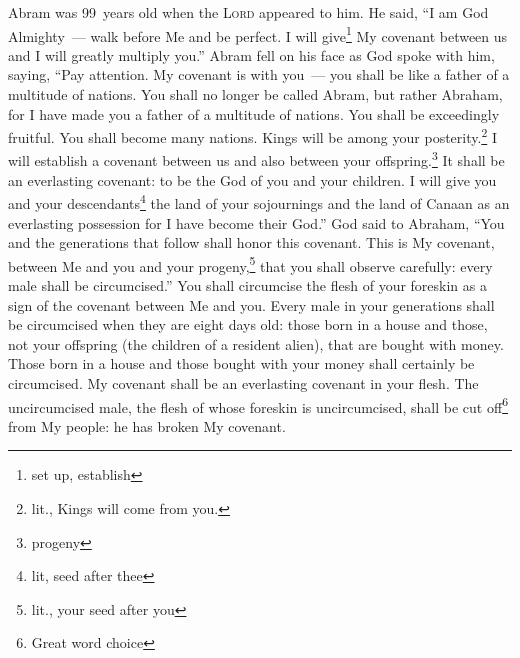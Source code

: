 
\begin{inparaenum}
     Abram was 99~years old when the \textsc{Lord} appeared to him. He said, ``I am God Almighty~--- walk before Me and be perfect.%
     I will give\footnote{set up, establish} My covenant between us and I will greatly multiply you.''%
     Abram fell on his face as God spoke with him, saying,%
     ``Pay attention. My covenant is with you~--- you shall be like a father of a multitude of nations.%
     You shall no longer be called Abram, but rather Abraham, for I have made you a father of a multitude of nations.%
     You shall be exceedingly fruitful. You shall become many nations. Kings will be among your posterity.\footnote{lit., Kings will come from you.}%
     I will establish a covenant between us and also between your offspring.\footnote{progeny} It shall be an everlasting covenant: to be the God of you and your children.%
     I will give you and your descendants\footnote{lit, seed after thee} the land of your sojournings and the land of Canaan as an everlasting possession for I have become their God.''%
     God said to Abraham, ``You and the generations that follow shall honor this covenant.%
     This is My covenant, between Me and you and your progeny,\footnote{lit., your seed after you} that you shall observe carefully: every male shall be circumcised.''%
     You shall circumcise the flesh of your foreskin as a sign of the covenant between Me and you.%
     Every male in your generations shall be circumcised when they are eight days old: those born in a house and those, not your offspring (the children of a resident alien), that are bought with money.%
     Those born in a house and those bought with your money shall certainly be circumcised. My covenant shall be an everlasting covenant in your flesh.%
     The uncircumcised male, the flesh of whose foreskin is uncircumcised, shall be cut off\footnote{Great word choice} from My people: he has broken My covenant.%
    

\end{inparaenum}
